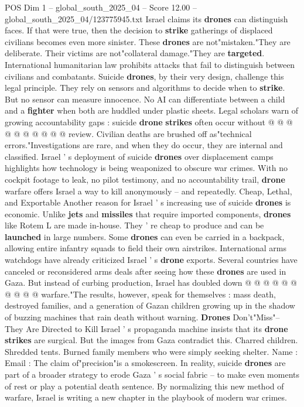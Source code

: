 \begin{textsample}{POS Dim 1 – global\_south\_2025\_04 – Score 12.00 – global\_south\_2025\_04/123775945.txt}
Israel claims its \textbf{drones} can distinguish faces.
If that were true, then the decision to \textbf{strike} gatherings of displaced civilians becomes even more sinister.
These \textbf{drones} are not"mistaken."They are deliberate.
Their victims are not"collateral damage."They are \textbf{targeted}.
International humanitarian law prohibits attacks that fail to distinguish between civilians and combatants.
Suicide \textbf{drones}, by their very design, challenge this legal principle.
They rely on sensors and algorithms to decide when to \textbf{strike}.
But no sensor can measure innocence.
No AI can differentiate between a child and a \textbf{fighter} when both are huddled under plastic sheets.
Legal scholars warn of growing accountability gaps : suicide \textbf{drone} \textbf{strikes} often occur without @ @ @ @ @ @ @ @ @ @ review.
Civilian deaths are brushed off as"technical errors."Investigations are rare, and when they do occur, they are internal and classified.
Israel ' s deployment of suicide \textbf{drones} over displacement camps highlights how technology is being weaponized to obscure war crimes.
With no cockpit footage to leak, no pilot testimony, and no accountability trail, \textbf{drone} warfare offers Israel a way to kill anonymously -- and repeatedly.
Cheap, Lethal, and Exportable Another reason for Israel ' s increasing use of suicide \textbf{drones} is economic.
Unlike \textbf{jets} and \textbf{missiles} that require imported components, \textbf{drones} like Rotem L are made in-house.
They ' re cheap to produce and can be \textbf{launched} in large numbers.
Some \textbf{drones} can even be carried in a backpack, allowing entire infantry squads to field their own airstrikes.
International arms watchdogs have already criticized Israel ' s \textbf{drone} exports.
Several countries have canceled or reconsidered arms deals after seeing how these \textbf{drones} are used in Gaza.
But instead of curbing production, Israel has doubled down @ @ @ @ @ @ @ @ @ @ warfare."The results, however, speak for themselves : mass death, destroyed families, and a generation of Gazan children growing up in the shadow of buzzing machines that rain death without warning. \textbf{Drones} Don't"Miss"-- They Are Directed to Kill Israel ' s propaganda machine insists that its \textbf{drone} \textbf{strikes} are surgical.
But the images from Gaza contradict this.
Charred children.
Shredded tents.
Burned family members who were simply seeking shelter.
Name : Email : The claim of"precision"is a smokescreen.
In reality, suicide \textbf{drones} are part of a broader strategy to erode Gaza ' s social fabric -- to make even moments of rest or play a potential death sentence.
By normalizing this new method of warfare, Israel is writing a new chapter in the playbook of modern war crimes.

\end{textsample}
